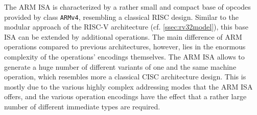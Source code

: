 The ARM \gls{ISA} is characterized by a rather small and compact base of opcodes provided by class \texttt{ARMv4}, resembling a classical \gls{RISC} design.
Similar to the modular approach of the RISC-V architecture (cf. \cref{ssec:rv32model}), this base \gls{ISA} can be extended by additional operations.
The main difference of ARM operations compared to previous architectures, however, lies in the enormous complexity of the operations' encodings themselves.
The ARM \gls{ISA} allows to generate a huge number of different variants of one and the same machine operation, which resembles more a classical \gls{CISC} architecture design.
This is mostly due to the various highly complex addressing modes that the ARM \gls{ISA} offers, and the various operation encodings have the effect that a rather large number of different immediate types are required.

